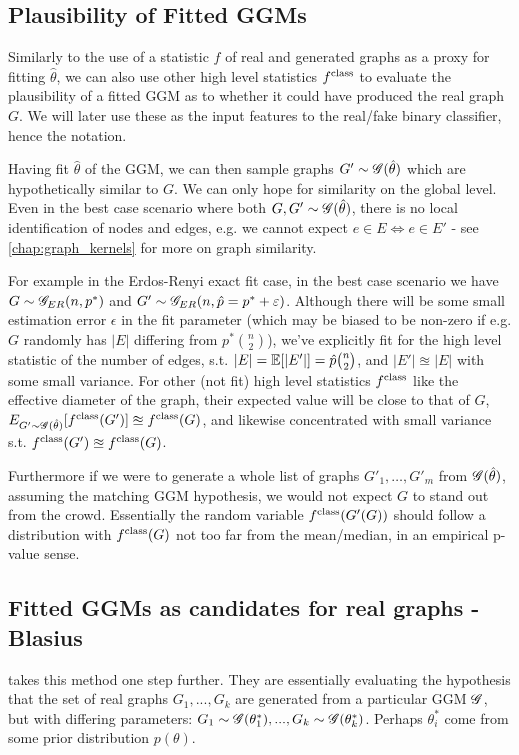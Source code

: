 \subsection{Plausibility of Fitted GGMs}

Similarly to the use of a statistic $f$ of real and generated graphs as a proxy for fitting $\hat{\theta}$, we can also use other high level statistics $f^{\mathrm{class}}$ to evaluate the plausibility of a fitted GGM as to whether it could have produced the real graph $G$. We will later use these as the input features to the real/fake binary classifier, hence the notation.

Having fit $\hat{\theta}$ of the GGM, we can then sample graphs $G' \sim \mathscr{G}(\hat{\theta})$ which are hypothetically similar to $G$. We can only hope for similarity on the global level. Even in the best case scenario where both $G, G' \sim \mathscr{G}(\hat{\theta})$, there is no local identification of nodes and edges, e.g. we cannot expect  $e \in E \iff e \in E'$ - see \cref{chap:graph_kernels} for more on graph similarity.

For example in the Erdos-Renyi exact fit case, in the best case scenario we have $G \sim \mathscr{G}_{ER}(n, p^*)$ and $G' \sim \mathscr{G}_{ER}(n, \hat{p} = p^* + \varepsilon)$. Although there will be some small estimation error $\epsilon$ in the fit parameter (which may be biased to be non-zero if e.g. $G$ randomly has $|E|$ differing from $p^* {n \choose 2}$), we've explicitly fit for the high level statistic of the number of edges, s.t. $|E| = \mathbb{E}[|E'|] = \hat{p} \binom{n}{2}$, and $|E'| \approxeq |E|$ with some small variance. For other (not fit) high level statistics $f^{\mathrm{class}}$ like the effective diameter of the graph, their expected value will be close to that of $G$, $E_{G' \sim \mathscr{G}(\hat{\theta})}[f^{\mathrm{class}}(G')] \approxeq f^{\mathrm{class}}(G)$, and likewise concentrated with small variance s.t. $f^{\mathrm{class}}(G') \approxeq f^{\mathrm{class}}(G)$.


Furthermore if we were to generate a whole list of graphs $G'_1, \dots, G'_m$ from $\mathscr{G}(\hat{\theta})$, assuming the matching GGM hypothesis, we would not expect $G$ to stand out from the crowd. Essentially the random variable $f^{\mathrm{class}}(G'(G))$ should follow a distribution with $f^{\mathrm{class}}(G)$ not too far from the mean/median, in an empirical p-value sense.


\subsection{Fitted GGMs as candidates for real graphs - Blasius}
\label{sec:ggm_blasius_framework}
\cite{blasius2018towards} takes this method one step further. They are essentially evaluating the hypothesis that the set of real graphs $G_1, ..., G_k$ are generated from a particular GGM $\mathscr{G}$, but with differing parameters: $G_1 \sim \mathscr{G}(\theta^*_1), ..., G_k \sim \mathscr{G}(\theta^*_k)$. Perhaps $\theta^*_i$ come from some prior distribution $p(\theta)$.

